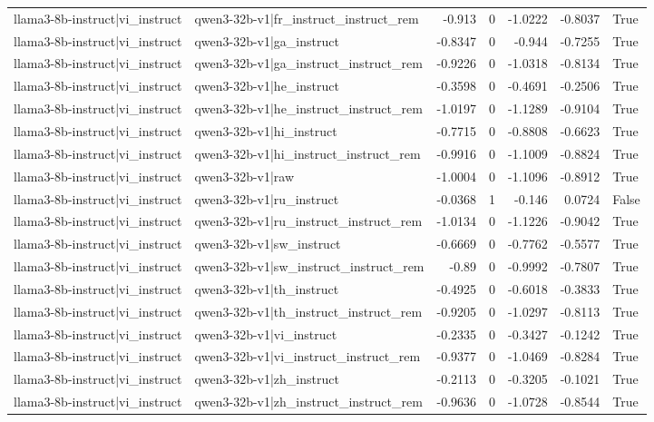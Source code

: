 \begin{table}
\begin{tabular}{l l r r r r l}
llama3-8b-instruct|vi_instruct & qwen3-32b-v1|fr_instruct_instruct_rem & -0.913 & 0 & -1.0222 & -0.8037 & True \\
llama3-8b-instruct|vi_instruct & qwen3-32b-v1|ga_instruct & -0.8347 & 0 & -0.944 & -0.7255 & True \\
llama3-8b-instruct|vi_instruct & qwen3-32b-v1|ga_instruct_instruct_rem & -0.9226 & 0 & -1.0318 & -0.8134 & True \\
llama3-8b-instruct|vi_instruct & qwen3-32b-v1|he_instruct & -0.3598 & 0 & -0.4691 & -0.2506 & True \\
llama3-8b-instruct|vi_instruct & qwen3-32b-v1|he_instruct_instruct_rem & -1.0197 & 0 & -1.1289 & -0.9104 & True \\
llama3-8b-instruct|vi_instruct & qwen3-32b-v1|hi_instruct & -0.7715 & 0 & -0.8808 & -0.6623 & True \\
llama3-8b-instruct|vi_instruct & qwen3-32b-v1|hi_instruct_instruct_rem & -0.9916 & 0 & -1.1009 & -0.8824 & True \\
llama3-8b-instruct|vi_instruct & qwen3-32b-v1|raw & -1.0004 & 0 & -1.1096 & -0.8912 & True \\
llama3-8b-instruct|vi_instruct & qwen3-32b-v1|ru_instruct & -0.0368 & 1 & -0.146 & 0.0724 & False \\
llama3-8b-instruct|vi_instruct & qwen3-32b-v1|ru_instruct_instruct_rem & -1.0134 & 0 & -1.1226 & -0.9042 & True \\
llama3-8b-instruct|vi_instruct & qwen3-32b-v1|sw_instruct & -0.6669 & 0 & -0.7762 & -0.5577 & True \\
llama3-8b-instruct|vi_instruct & qwen3-32b-v1|sw_instruct_instruct_rem & -0.89 & 0 & -0.9992 & -0.7807 & True \\
llama3-8b-instruct|vi_instruct & qwen3-32b-v1|th_instruct & -0.4925 & 0 & -0.6018 & -0.3833 & True \\
llama3-8b-instruct|vi_instruct & qwen3-32b-v1|th_instruct_instruct_rem & -0.9205 & 0 & -1.0297 & -0.8113 & True \\
llama3-8b-instruct|vi_instruct & qwen3-32b-v1|vi_instruct & -0.2335 & 0 & -0.3427 & -0.1242 & True \\
llama3-8b-instruct|vi_instruct & qwen3-32b-v1|vi_instruct_instruct_rem & -0.9377 & 0 & -1.0469 & -0.8284 & True \\
llama3-8b-instruct|vi_instruct & qwen3-32b-v1|zh_instruct & -0.2113 & 0 & -0.3205 & -0.1021 & True \\
llama3-8b-instruct|vi_instruct & qwen3-32b-v1|zh_instruct_instruct_rem & -0.9636 & 0 & -1.0728 & -0.8544 & True \\

\end{tabular}
\end{table}
